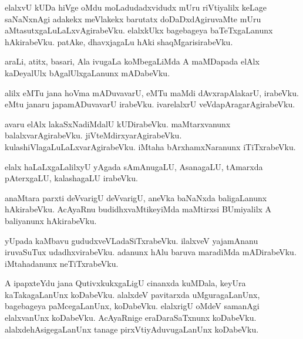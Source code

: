 \documentclass{article}
\begin{document}
\begin{mn}
elalxvU  kUDa  hiVge  oMdu  moLadudadxvidudx  mUru  riVtiyalilx  keLage  saNaNxnAgi  adakekx  
meVlakekx  barutatx  doDaDxdAgiruvaMte  mUru  aMtasutxgaLuLaLxvAgirabeVku.  elalxkUkx  
bagebageya  baTeTxgaLanunx  hAkirabeVku.  patAke,  dhavxjagaLu  hAki  shaqMgarisirabeVku.
\end{mn}

\begin{mn}
araLi, atitx,  basari,  Ala  ivugaLa  koMbegaLiMda  A  maMDapada  elAlx  kaDeyalUlx  
bAgalUlxgaLanunx  mADabeVku.
\end{mn}

\begin{mn}
alilx  eMTu  jana  hoVma mADuvavarU,  eMTu  maMdi  dAvxrapAlakarU,  irabeVku.  eMtu  
janaru  japamADuvavarU  irabeVku.  ivarelalxrU  veVdapAragarAgirabeVku.
\end{mn}

\begin{mn}
avaru  elAlx  lakaSxNadiMdalU  kUDirabeVku.  maMtarxvanunx  balalxvarAgirabeVku.  
jiVteMdirxyarAgirabeVku.  kulashiVlagaLuLaLxvarAgirabeVku.  iMtaha  bArxhamxNaranunx  iTiTxrabeVku.
\end{mn}

\begin{mn}
elalx  haLaLxgaLalilxyU  yAgada  sAmAnugaLU,  AsanagaLU,  tAmarxda  pAterxgaLU,  kalashagaLU  irabeVku.
\end{mn}

\begin{mn}
anaMtara  parxti  deVvarigU  deVvarigU,  aneVka  baNaNxda  baligaLanunx  hAkirabeVku.  
AcAyaRnu  budidhxvaMtikeyiMda  maMtirxsi  BUmiyalilx  A  baliyanunx  hAkirabeVku.  
\end{mn}

\begin{mn}
yUpada  kaMbavu  gududxveVLadaSiTxrabeVku.  ilalxveV  yajamAnanu  iruvaSuTux  udadhxvirabeVku.  
adanunx  hAlu  baruva  maradiMda  mADirabeVku.  iMtahadanunx  neTiTxrabeVku.
\end{mn}

\begin{mn}
A  ipapxteYdu  jana  QutivxkukxgaLigU  cinanxda  kuMDala,  keyUra  kaTakagaLanUnx  koDabeVku.  
alalxdeV  pavitarxda  uMguragaLanUnx,  bagebageya  paMcegaLanUnx,  koDabeVku.  elalxrigU  oMdeV  
samanAgi  elalxvanUnx  koDabeVku.  AcAyaRnige  eraDaraSaTxnunx  koDabeVku.  alalxdehAsigegaLanUnx  
tanage  pirxVtiyAduvugaLanUnx  koDabeVku.
\end{mn}
\end{document}
